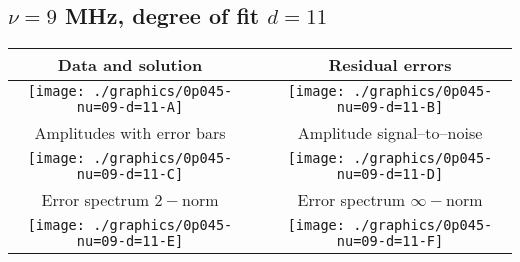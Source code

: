 

% 

\clearpage{}
\break{}

\subsection{$\nu = 9$ MHz, degree of fit $d = 11$}

\begin{table}[h]
    \begin{center}
        \begin{tabular}{ccc}
            Data and solution & \quad & Residual errors \\\hline
            \texttt{[image: ./graphics/0p045-nu=09-d=11-A]} &&
            \texttt{[image: ./graphics/0p045-nu=09-d=11-B]} \\[15pt]
            Amplitudes with error bars && Amplitude signal--to--noise \\\hline
            \texttt{[image: ./graphics/0p045-nu=09-d=11-C]} &&
            \texttt{[image: ./graphics/0p045-nu=09-d=11-D]} \\[15pt]
            Error spectrum $2-$norm && Error spectrum $\infty-$norm \\\hline
            \texttt{[image: ./graphics/0p045-nu=09-d=11-E]} &&
            \texttt{[image: ./graphics/0p045-nu=09-d=11-F]} \\[15pt]
        \end{tabular}
    \end{center}
\label{fig:elev=45, nu=9}
\end{table}



\endinput
